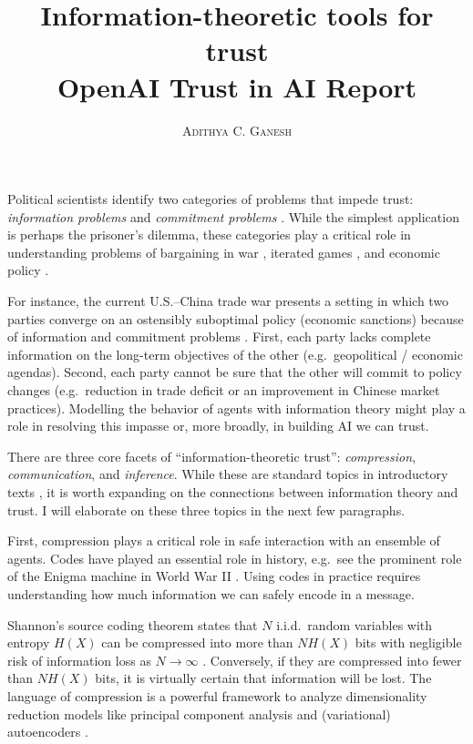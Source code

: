 \documentclass[11pt]{article}
\title{Information-theoretic tools for trust \\ \vspace{0.3cm} OpenAI Trust in AI Report}
\author{\textsc{Adithya C. Ganesh}}
\begin{document}
Political scientists identify two categories of problems that impede trust: {\it information problems} and {\it commitment problems} \cite{frieden2010world}.  While the simplest application is perhaps the prisoner's dilemma, these categories play a critical role in understanding problems of bargaining in war \cite{lake2010two}, iterated games \cite{axelrod1981evolution}, and economic policy \cite{panagariya2003international}.

For instance, the current U.S.--China trade war presents a setting in which two parties converge on an ostensibly suboptimal policy (economic sanctions) because of information and commitment problems \cite{liu2018understanding, amiti2019impact, li2018economic}.  First, each party lacks complete information on the long-term objectives of the other (e.g.\ geopolitical / economic agendas).  Second, each party cannot be sure that the other will commit to policy changes (e.g.\ reduction in trade deficit or an improvement in Chinese market practices).  Modelling the behavior of agents with information theory might play a role in resolving this impasse or, more broadly, in building AI we can trust. 

There are three core facets of ``information-theoretic trust'': {\it compression}, {\it communication}, and {\it inference}.  While these are standard topics in introductory texts \cite{cover2012elements, mackay2003information}, it is worth expanding on the connections between information theory and trust.  I will elaborate on these three topics in the next few paragraphs.

First, compression plays a critical role in safe interaction with an ensemble of agents.  Codes have played an essential role in history, e.g.\ see the prominent role of the Enigma machine in World War II \cite{booss2003mathematics}.  Using codes in practice requires understanding how much information we can safely encode in a message.

Shannon's source coding theorem states that $N$ i.i.d.\ random variables with entropy $H(X)$ can be compressed into more than $N H(X)$ bits with negligible risk of information loss as $N \to \infty$ \cite{shannon1948mathematical, mackay2003information}.  Conversely, if they are compressed into fewer than $N H(X)$ bits, it is virtually certain that information will be lost.  The language of compression is a powerful framework to analyze dimensionality reduction models like principal component analysis \cite{geiger2012relative} and (variational) autoencoders \cite{doersch2016tutorial}.
\end{document}
